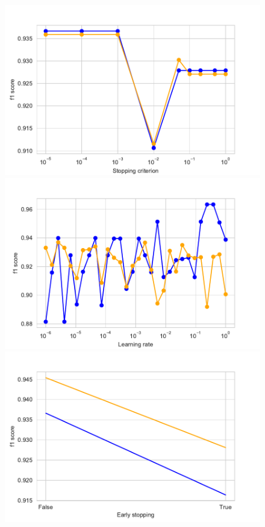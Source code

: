 \documentclass[11pt]{article}
\begin{document}
\begin{figure}
\begin{minipage}[l]{0.3\textwidth}
\end{minipage}\\
\begin{minipage}[t]{0.3\textwidth}
\includegraphics[width=1\linewidth]{voting/tol_ppn.pdf}
\end{minipage}
\begin{minipage}[t]{0.3\textwidth}
\includegraphics[width=1\linewidth]{voting/learning_rate_ppn.pdf}
\end{minipage}
\begin{minipage}[t]{0.3\textwidth}
\includegraphics[width=1\linewidth]{voting/early_stopping_ppn.pdf}

\end{minipage}
\end{figure}
\end{document}
